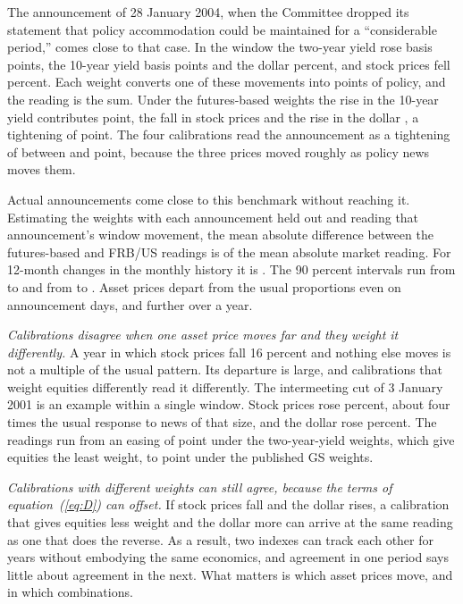 \documentclass[11pt]{article}
\begin{document}
The announcement of 28 January 2004, when the Committee dropped its statement that policy accommodation could be maintained for a ``considerable period,'' comes close to that case. In the window the two-year yield rose  basis points, the 10-year yield  basis points and the dollar  percent, and stock prices fell  percent. Each weight converts one of these movements into points of policy, and the reading is the sum. Under the futures-based weights the rise in the 10-year yield contributes  point, the fall in stock prices  and the rise in the dollar , a tightening of  point. The four calibrations read the announcement as a tightening of between  and  point, because the three prices moved roughly as policy news moves them.

Actual announcements come close to this benchmark without reaching it. Estimating the weights with each announcement held out and reading that announcement's window movement, the mean absolute difference between the futures-based and FRB/US readings is  of the mean absolute market reading. For 12-month changes in the monthly history it is . The 90 percent intervals run from  to  and from  to . Asset prices depart from the usual proportions even on announcement days, and further over a year.

\textit{Calibrations disagree when one asset price moves far and they weight it differently.} A year in which stock prices fall 16 percent and nothing else moves is not a multiple of the usual pattern. Its departure is large, and calibrations that weight equities differently read it differently. The intermeeting cut of 3 January 2001 is an example within a single window. Stock prices rose  percent, about four times the usual response to news of that size, and the dollar rose  percent. The readings run from an easing of  point under the two-year-yield weights, which give equities the least weight, to  point under the published GS weights.

\textit{Calibrations with different weights can still agree, because the terms of equation~(\ref{eq:D}) can offset.} If stock prices fall and the dollar rises, a calibration that gives equities less weight and the dollar more can arrive at the same reading as one that does the reverse. As a result, two indexes can track each other for years without embodying the same economics, and agreement in one period says little about agreement in the next. What matters is which asset prices move, and in which combinations.
\FloatBarrier
\end{document}

